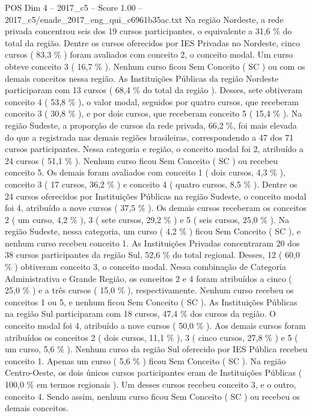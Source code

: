 \begin{textsample}{POS Dim 4 – 2017\_c5 – Score 1.00 – 2017\_c5/enade\_2017\_eng\_qui\_c6961b35ac.txt}
Na região Nordeste, a rede privada concentrou seis dos 19 cursos participantes, o equivalente a 31,6 \% do total da região.
Dentre os cursos oferecidos por IES Privadas no Nordeste, cinco cursos ( 83,3 \% ) foram avaliados com conceito 2, o conceito modal.
Um curso obteve conceito 3 ( 16,7 \% ).
Nenhum curso ficou Sem Conceito ( SC ) ou com os demais conceitos nessa região.
As Instituições Públicas da região Nordeste participaram com 13 cursos ( 68,4 \% do total da região ).
Desses, sete obtiveram conceito 4 ( 53,8 \% ), o valor modal, seguidos por quatro cursos, que receberam conceito 3 ( 30,8 \% ), e por dois cursos, que receberam conceito 5 ( 15,4 \% ).
Na região Sudeste, a proporção de cursos da rede privada, 66,2 \%, foi mais elevada do que a registrada nas demais regiões brasileiras, correspondendo a 47 dos 71 cursos participantes.
Nessa categoria e região, o conceito modal foi 2, atribuído a 24 cursos ( 51,1 \% ).
Nenhum curso ficou Sem Conceito ( SC ) ou recebeu conceito 5.
Os demais foram avaliados com conceito 1 ( dois cursos, 4,3 \% ), conceito 3 ( 17 cursos, 36,2 \% ) e conceito 4 ( quatro cursos, 8,5 \% ).
Dentre os 24 cursos oferecidos por Instituições Públicas na região Sudeste, o conceito modal foi 4, atribuído a nove cursos ( 37,5 \% ).
Os demais cursos receberam os conceitos 2 ( um curso, 4,2 \% ), 3 ( sete cursos, 29,2 \% ) e 5 ( seis cursos, 25,0 \% ).
Na região Sudeste, nessa categoria, um curso ( 4,2 \% ) ficou Sem Conceito ( SC ), e nenhum curso recebeu conceito 1.
As Instituições Privadas concentraram 20 dos 38 cursos participantes da região Sul, 52,6 \% do total regional.
Desses, 12 ( 60,0 \% ) obtiveram conceito 3, o conceito modal.
Nessa combinação de Categoria Administrativa e Grande Região, os conceitos 2 e 4 foram atribuídos a cinco ( 25,0 \% ) e a três cursos ( 15,0 \% ), respectivamente.
Nenhum curso recebeu os conceitos 1 ou 5, e nenhum ficou Sem Conceito ( SC ).
As Instituições Públicas na região Sul participaram com 18 cursos, 47,4 \% dos cursos da região.
O conceito modal foi 4, atribuído a nove cursos ( 50,0 \% ).
Aos demais cursos foram atribuídos os conceitos 2 ( dois cursos, 11,1 \% ), 3 ( cinco cursos, 27,8 \% ) e 5 ( um curso, 5,6 \% ).
Nenhum curso da região Sul oferecido por IES Pública recebeu conceito 1.
Apenas um curso ( 5,6 \% ) ficou Sem Conceito ( SC ).
Na região Centro-Oeste, os dois únicos cursos participantes eram de Instituições Públicas ( 100,0 \% em termos regionais ).
Um desses cursos recebeu conceito 3, e o outro, conceito 4.
Sendo assim, nenhum curso ficou Sem Conceito ( SC ) ou recebeu os demais conceitos.

\end{textsample}
